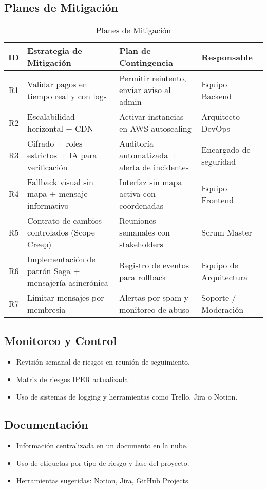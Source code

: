 	\subsection{Planes de Mitigación}
		\begin{table}[H]
			\centering
			\caption{Planes de Mitigación}
			\begin{tabularx}{\textwidth}{|c|X|X|X|}
				\hline
				\textbf{ID} & \textbf{Estrategia de Mitigación} & \textbf{Plan de Contingencia} & \textbf{Responsable} \\
				\hline
				R1 & Validar pagos en tiempo real y con logs & Permitir reintento, enviar aviso al admin & Equipo Backend \\
				\hline
				R2 & Escalabilidad horizontal + CDN & Activar instancias en AWS autoscaling & Arquitecto DevOps \\
				\hline
				R3 & Cifrado + roles estrictos + IA para verificación & Auditoría automatizada + alerta de incidentes & Encargado de seguridad \\
				\hline
				R4 & Fallback visual sin mapa + mensaje informativo & Interfaz sin mapa activa con coordenadas & Equipo Frontend \\
				\hline
				R5 & Contrato de cambios controlados (Scope Creep) & Reuniones semanales con stakeholders & Scrum Master \\
				\hline
				R6 & Implementación de patrón Saga + mensajería asincrónica & Registro de eventos para rollback & Equipo de Arquitectura \\
				\hline
				R7 & Limitar mensajes por membresía & Alertas por spam y monitoreo de abuso & Soporte / Moderación \\
				\hline
			\end{tabularx}
		\end{table}
	
	\newpage
	\subsection{Monitoreo y Control}
	\begin{itemize}
		\item Revisión semanal de riesgos en reunión de seguimiento.
		\item Matriz de riesgos IPER actualizada.
		\item Uso de sistemas de logging y herramientas como Trello, Jira o Notion.
	\end{itemize}
	
	\subsection{Documentación}
	\begin{itemize}
		\item Información centralizada en un documento en la nube.
		\item Uso de etiquetas por tipo de riesgo y fase del proyecto.
		\item Herramientas sugeridas: Notion, Jira, GitHub Projects.
	\end{itemize}

